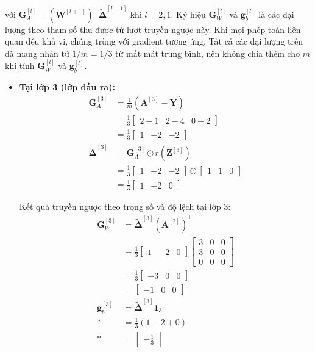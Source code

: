 với $\mathbf{G}_A^{[l]}=(\mathbf{W}^{[l+1]})^{\top}\widetilde{\boldsymbol{\Delta}}^{[l+1]}$ khi $l=2,1$. Ký hiệu $\mathbf{G}_W^{[l]}$ và $\mathbf{g}_b^{[l]}$ là các đại lượng theo tham số thu được từ lượt truyền ngược này. Khi mọi phép toán liên quan đều khả vi, chúng trùng với gradient tương ứng. Tất cả các đại lượng trên đã mang nhân tử $1/m=1/3$ từ mất mát trung bình, nên không chia thêm cho $m$ khi tính $\mathbf{G}_W^{[l]}$ và $\mathbf{g}_b^{[l]}$.
\begin{itemize}
    \item \textbf{Tại lớp 3 (lớp đầu ra):}
    \begin{align*}
    \mathbf{G}_A^{[3]} &= \frac{1}{m}\left(\mathbf{A}^{[3]} - \mathbf{Y}\right) \\
    &= \frac{1}{3}\begin{bmatrix} 2-1 & 2-4 & 0-2 \end{bmatrix} \\
    &= \frac{1}{3}\begin{bmatrix} 1 & -2 & -2 \end{bmatrix} \\
    \widetilde{\boldsymbol{\Delta}}^{[3]} &= \mathbf{G}_A^{[3]} \odot r\!\left(\mathbf{Z}^{[3]}\right) \\
    &= \frac{1}{3}\begin{bmatrix} 1 & -2 & -2 \end{bmatrix} \odot \begin{bmatrix} 1 & 1 & 0 \end{bmatrix} \\
    &= \frac{1}{3}\begin{bmatrix} 1 & -2 & 0 \end{bmatrix}
    \end{align*}

    Kết quả truyền ngược theo trọng số và độ lệch tại lớp 3:
    \begin{align*}
    \mathbf{G}_W^{[3]} &= \widetilde{\boldsymbol{\Delta}}^{[3]}\left(\mathbf{A}^{[2]}\right)^{\top} \\
    &= \frac{1}{3}\begin{bmatrix} 1 & -2 & 0 \end{bmatrix}\begin{bmatrix} 3 & 0 & 0 \\ 3 & 0 & 0 \\ 0 & 0 & 0 \end{bmatrix} \\
    &= \frac{1}{3}\begin{bmatrix} -3 & 0 & 0 \end{bmatrix} \\
    &= \begin{bmatrix} -1 & 0 & 0 \end{bmatrix} \\
    \mathbf{g}_b^{[3]} &= \widetilde{\boldsymbol{\Delta}}^{[3]}\mathbf{1}_3 \\*
    &= \frac{1}{3}\left(1 - 2 + 0\right) \\*
    &= \begin{bmatrix}-\frac{1}{3}\end{bmatrix}
    \end{align*}


\end{itemize}
